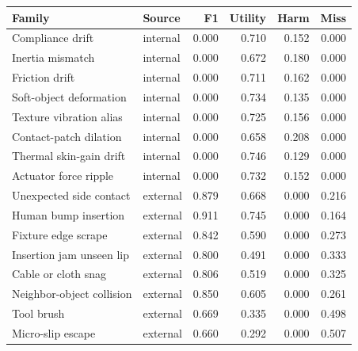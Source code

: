 \begin{tabular}{llrrrr}
\toprule
Family & Source & F1 & Utility & Harm & Miss \\
\midrule
Compliance drift & internal & 0.000 & 0.710 & 0.152 & 0.000 \\
Inertia mismatch & internal & 0.000 & 0.672 & 0.180 & 0.000 \\
Friction drift & internal & 0.000 & 0.711 & 0.162 & 0.000 \\
Soft-object deformation & internal & 0.000 & 0.734 & 0.135 & 0.000 \\
Texture vibration alias & internal & 0.000 & 0.725 & 0.156 & 0.000 \\
Contact-patch dilation & internal & 0.000 & 0.658 & 0.208 & 0.000 \\
Thermal skin-gain drift & internal & 0.000 & 0.746 & 0.129 & 0.000 \\
Actuator force ripple & internal & 0.000 & 0.732 & 0.152 & 0.000 \\
Unexpected side contact & external & 0.879 & 0.668 & 0.000 & 0.216 \\
Human bump insertion & external & 0.911 & 0.745 & 0.000 & 0.164 \\
Fixture edge scrape & external & 0.842 & 0.590 & 0.000 & 0.273 \\
Insertion jam unseen lip & external & 0.800 & 0.491 & 0.000 & 0.333 \\
Cable or cloth snag & external & 0.806 & 0.519 & 0.000 & 0.325 \\
Neighbor-object collision & external & 0.850 & 0.605 & 0.000 & 0.261 \\
Tool brush & external & 0.669 & 0.335 & 0.000 & 0.498 \\
Micro-slip escape & external & 0.660 & 0.292 & 0.000 & 0.507 \\
\bottomrule
\end{tabular}
